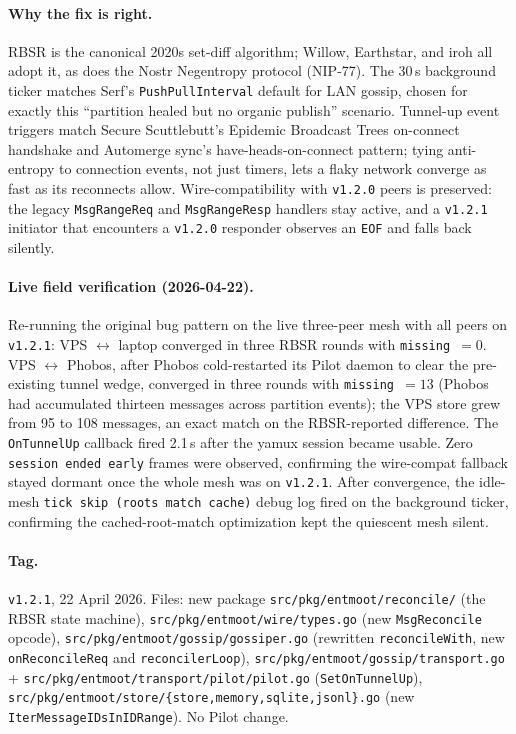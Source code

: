 \documentclass[11pt,a4paper]{article}
\begin{document}
\paragraph{Why the fix is right.} RBSR is the canonical 2020s
set-diff algorithm; Willow, Earthstar, and iroh all adopt it,
as does the Nostr Negentropy protocol (NIP-77). The 30\,s
background ticker
matches Serf's \texttt{PushPullInterval} default for LAN
gossip, chosen for exactly this ``partition healed but no
organic publish'' scenario. Tunnel-up event triggers match
Secure Scuttlebutt's Epidemic Broadcast Trees
on-connect handshake and Automerge sync's
have-heads-on-connect pattern; tying anti-entropy to
connection events, not just timers, lets a flaky network
converge as fast as its reconnects allow. Wire-compatibility
with \texttt{v1.2.0} peers is preserved: the legacy
\texttt{MsgRangeReq} and \texttt{MsgRangeResp} handlers stay
active, and a \texttt{v1.2.1} initiator that encounters a
\texttt{v1.2.0} responder observes an \texttt{EOF} and falls
back silently.

\paragraph*{Live field verification (2026-04-22).} Re-running
the original bug pattern on the live three-peer mesh with all
peers on \texttt{v1.2.1}: VPS $\leftrightarrow$ laptop converged
in three RBSR rounds with \texttt{missing}~$=0$. VPS
$\leftrightarrow$ Phobos, after Phobos cold-restarted its Pilot
daemon to clear the pre-existing tunnel wedge, converged in
three rounds with \texttt{missing}~$=13$ (Phobos had
accumulated thirteen messages across partition events); the
VPS store grew from 95 to 108 messages, an exact match on the
RBSR-reported difference. The \texttt{OnTunnelUp} callback
fired 2.1\,s after the yamux session became usable. Zero
\texttt{session ended early} frames were observed, confirming
the wire-compat fallback stayed dormant once the whole mesh was
on \texttt{v1.2.1}. After convergence, the idle-mesh
\texttt{tick skip (roots match cache)} debug log fired on the
background ticker, confirming the cached-root-match
optimization kept the quiescent mesh silent.

\paragraph*{Tag.} \texttt{v1.2.1}, 22 April 2026. Files: new
package \texttt{src/pkg/entmoot/reconcile/} (the RBSR state
machine), \texttt{src/pkg/entmoot/wire/types.go} (new
\texttt{MsgReconcile} opcode),
\texttt{src/pkg/entmoot/gossip/gossiper.go} (rewritten
\texttt{reconcileWith}, new \texttt{onReconcileReq} and
\texttt{reconcilerLoop}),
\texttt{src/pkg/entmoot/gossip/transport.go} +
\texttt{src/pkg/entmoot/transport/pilot/pilot.go}
(\texttt{SetOnTunnelUp}),
\texttt{src/pkg/entmoot/store/\{store,memory,sqlite,jsonl\}.go}
(new \texttt{IterMessageIDsInIDRange}). No Pilot change.
\end{document}
